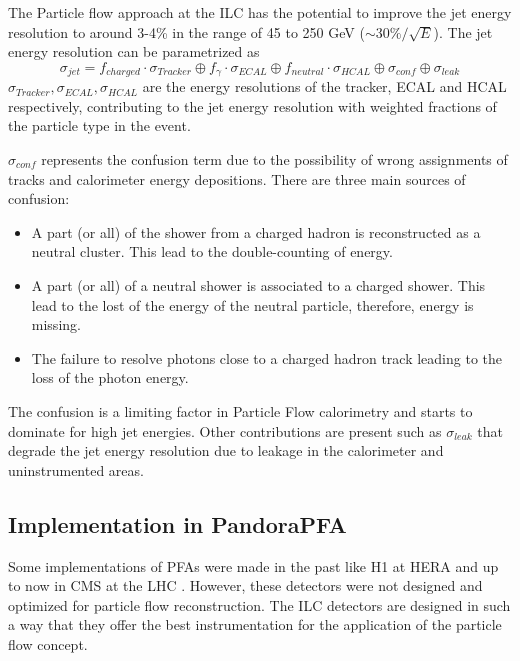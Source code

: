 The Particle flow approach at the ILC has the potential to improve the jet energy resolution to around 3-4\% in the range of 45 to 250 GeV ($\sim 30\%/\sqrt{E}$). The jet energy resolution can be parametrized as
\begin{equation}
  \sigma_{jet} = f_{charged} \cdot \sigma_{Tracker} \oplus f_{\gamma} \cdot \sigma_{ECAL} \oplus f_{neutral} \cdot \sigma_{HCAL} \oplus \sigma_{conf} \oplus \sigma_{leak}
\end{equation}
$\sigma_{Tracker}, \sigma_{ECAL}, \sigma_{HCAL}$ are the energy resolutions of the tracker, ECAL and HCAL respectively, contributing to the jet energy resolution with weighted fractions of the particle type in the event.

$\sigma_{conf}$ represents the confusion term due to the possibility of wrong assignments of tracks and calorimeter energy depositions. There are three main sources of confusion:

\begin{itemize}
  \item A part (or all) of the shower from a charged hadron is reconstructed as a neutral cluster. This lead to the double-counting of energy.
  \item A part (or all) of a neutral shower is associated to a charged shower. This lead to the lost of the energy of the neutral particle, therefore, energy is missing.
  \item The failure to resolve photons close to a charged hadron track leading to the loss of the photon energy.
\end{itemize}

The confusion is a limiting factor in Particle Flow calorimetry and starts to dominate for high jet energies. Other contributions are present such as $\sigma_{leak}$ that degrade the jet energy resolution due to leakage in the calorimeter and uninstrumented areas.

\subsection{Implementation in PandoraPFA}

Some implementations of PFAs were made in the past like H1 at HERA \cite{Abt:1994ye} and up to now in CMS at the LHC \cite{Sirunyan:2017ulk}. However, these detectors were not designed and optimized for particle flow reconstruction. The ILC detectors are designed in such a way that they offer the best instrumentation for the application of the particle flow concept.


